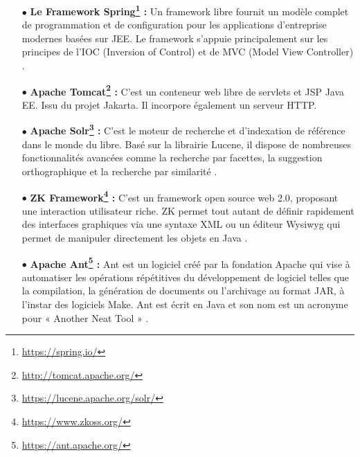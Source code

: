\begin{itemize}
\medskip
    \item[$\bullet$] \textbf{Le Framework Spring\footnote{\url{https://spring.io/}} :} Un framework libre fournit un modèle complet de programmation et de configuration pour les applications d’entreprise modernes basées sur JEE. Le framework s'appuie principalement sur les principes de l'IOC (Inversion of Control) et de MVC (Model View Controller) \cite{wiki:spring}.
    \medskip

    \item[$\bullet$] \textbf{Apache Tomcat\footnote{\url{http://tomcat.apache.org/}} :} C'est un conteneur web libre de servlets et JSP Java EE. Issu du projet Jakarta. Il incorpore également un serveur HTTP\cite{wiki:tomcat}.
    
    \medskip

    \item[$\bullet$] \textbf{Apache Solr\footnote{\url{https://lucene.apache.org/solr/}} :} C'est le moteur de recherche et d’indexation de référence dans le monde du libre. Basé sur la librairie Lucene, il dispose de nombreuses fonctionnalités avancées comme la recherche par facettes, la suggestion orthographique et la recherche par similarité \cite{wiki:solr}.
    \medskip

    \item[$\bullet$] \textbf{ZK Framework\footnote{\url{https://www.zkoss.org/}} :} C'est un framework open source web 2.0, proposant une interaction utilisateur riche. ZK permet tout autant de définir rapidement des interfaces graphiques via une syntaxe XML ou un éditeur Wysiwyg qui permet de manipuler directement les objets en Java \cite{wiki:zk}.
    \medskip
    
    \item[$\bullet$] \textbf{Apache Ant\footnote{\url{https://ant.apache.org/}} :} Ant est un logiciel créé par la fondation Apache qui vise à automatiser les opérations répétitives du développement de logiciel telles que la compilation, la génération de documents ou l'archivage au format JAR, à l'instar des logiciels Make. Ant est écrit en Java et son nom est un acronyme pour « Another Neat Tool » \cite{wiki:ant}.
    

\end{itemize}

